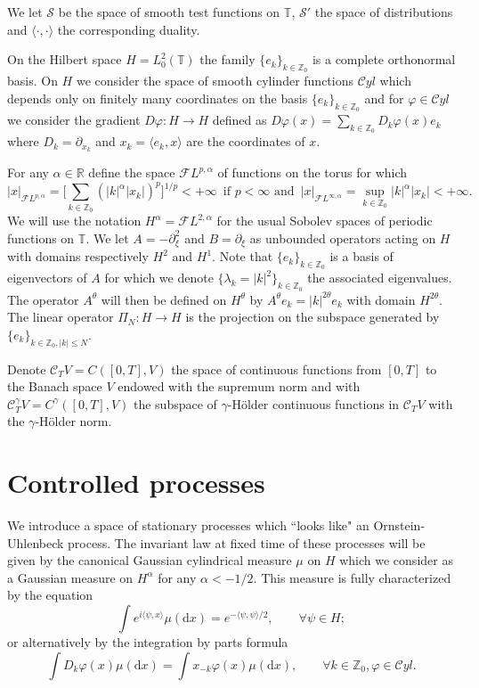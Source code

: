 \documentclass[11pt,a4paper,reqno]{amsart}
\newcommand{\TT}{\mathbb{T}}
\newcommand{\RR}{\mathbb{R}}
\newcommand{\ZZ}{\mathbb{Z}}
\newcommand{\cF}{\mathcal{F}}
\newcommand{\dd}{\mathrm{d}}
\newcommand{\Lz}{{L^2_0(\TT)}}
\newcommand{\cS}{\mathcal{S}}
\newcommand{\cC}{\mathcal{C}}
\newcommand{\cyl}{\mathcal{C}yl}
\begin{document}
We let $\cS$ be the space of smooth test functions on $\TT$, $\cS'$ the space of distributions and $\langle \cdot,\cdot\rangle$ the corresponding duality. 


On the Hilbert space $H=\Lz$ the family $\{e_k\}_{k\in\ZZ_0}$ is a complete orthonormal basis. On $H$ we consider the space of smooth cylinder functions  $\cyl$ which depends only on finitely many coordinates on the basis $\{e_k\}_{k\in \ZZ_0}$ and for $\varphi \in\cyl$ we consider the gradient $D \varphi : H\to H$ defined as $D \varphi(x) = \sum_{k\in\ZZ_0} D_k \varphi(x) e_k$ where $D_k = \partial_{x_k}$ and  $x_k = \langle e_k,x \rangle$ are the coordinates of $x$.

For any $\alpha\in \RR$ define the space $\cF L^{p,\alpha}$ of functions on the torus for which
$$
|x|_{\cF L^{p,\alpha}} = \big[\sum_{k\in\ZZ_0} (|k|^\alpha |x_k|)^p\big]^{1/p}<+\infty
\, \text{ 
if $p<\infty$ and 
 }\, 
|x|_{\cF L^{\infty,\alpha}} = \sup_{k\in\ZZ_0} |k|^\alpha |x_k| <+\infty .
$$
We will use the notation $H^\alpha = \cF L^{2,\alpha}$ for the usual Sobolev spaces of periodic functions on $\TT$.
We let $A=-\partial_\xi^2$ and $B=\partial_\xi$ as  unbounded operators acting on  $H$ with domains respectively $H^2$ and $H^{1}$. Note that $\{e_k\}_{k\in\ZZ_0}$ is a basis of eigenvectors of $A$ for which we denote $\{\lambda_k = |k|^2 \}_{k\in\ZZ_0}$ the associated eigenvalues.  The operator $A^\theta$ will then be defined on $H^{\theta}$ by $A^\theta e_k = |k|^{2\theta}e_k$ with domain $H^{2\theta}$.
The linear operator $\Pi_N: H \to H$ is the projection on the subspace generated by $\{e_k\}_{k\in\ZZ_0, |k|\le N}$. 

Denote $\cC_T V = C([0,T],V)$ the space of continuous functions from $[0,T]$ to the Banach space $V$ endowed with the supremum norm and with $\cC^\gamma_T V = C^\gamma([0,T],V)$ the subspace of $\gamma$-H\"older continuous functions in $\cC_T V$ with the $\gamma$-H\"older norm. 



\section{Controlled processes}
\label{sec:controlled}


We introduce a space of stationary processes which ``looks like" an Ornstein-Uhlenbeck process. The invariant law at fixed time of these processes will be given by the canonical Gaussian cylindrical measure $\mu$ on $H$ which we consider as a Gaussian measure on $H^{\alpha}$ for any $\alpha<-1/2$. This measure is fully characterized by the equation
$$
\int e^{i \langle \psi,x \rangle}\mu(\dd x) = e^{-\langle \psi,\psi\rangle/2}, \qquad \forall\psi\in H ;
$$
or alternatively by the integration by parts formula
$$
\int D_k \varphi(x) \mu(\dd x) = \int x_{-k} \varphi(x) \mu(\dd x),\qquad  \forall k\in\ZZ_0, \varphi \in\cyl .
$$
\end{document}
